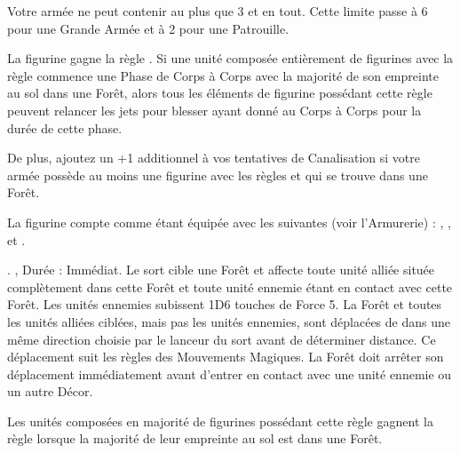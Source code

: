 \armyspecialruleentry{\therarestofspirits}

Votre armée ne peut contenir au plus que 3 \treefathers{} et \treefatherancients{} en tout. Cette limite passe à 6 pour une Grande Armée et à 2 pour une Patrouille.

\closearmywiderules






\vspace*{1.5cm}
\startarmyspecialrules

\armyspecialruleentry{\forestwalker}

La figurine gagne la règle \strider{\forest}. Si une unité composée entièrement de figurines avec la règle \forestwalker{} commence une Phase de Corps à Corps avec la majorité de son empreinte au sol dans une Forêt, alors tous les éléments de figurine possédant cette règle peuvent relancer les jets pour blesser ayant donné  au Corps à Corps pour la durée de cette phase.

De plus, ajoutez un +1 additionnel à vos tentatives de Canalisation si votre armée possède au moins une figurine avec les règles \channel{} et \forestwalker{} qui se trouve dans une Forêt. 

\armyspecialruleentry{\masterarcher}

La figurine compte comme étant équipée avec les \feyarrows{} suivantes (voir l'Armurerie) :\newline
\truemarkarrow{}, \starlightshaft{}, \perforatingtip{} et \jewelweedshot{}.

\armyspecialruleentry{\treesinging}

. , Durée : Immédiat.\newline
Le sort cible une Forêt et affecte toute unité alliée située complètement dans cette Forêt et toute unité ennemie étant en contact avec cette Forêt. Les unités ennemies subissent 1D6 touches de Force 5. La Forêt et toutes les unités alliées ciblées, mais pas les unités ennemies, sont déplacées de  dans une même direction choisie par le lanceur du sort avant de déterminer distance. Ce déplacement suit les règles des Mouvements Magiques. La Forêt doit arrêter son déplacement immédiatement avant d'entrer en contact avec une unité ennemie ou un autre Décor.

\armyspecialruleentry{\emboldeningboughs}

Les unités composées en majorité de figurines possédant cette règle gagnent la règle \stubborn{} lorsque la majorité de leur empreinte au sol est dans une Forêt.

